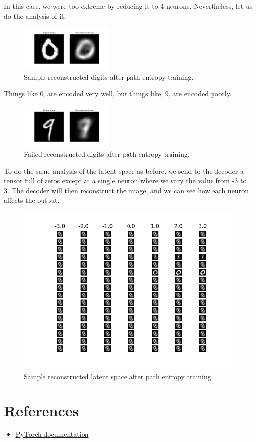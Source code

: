 \documentclass[12pt]{article}
\begin{document}
In this case, we were too extreme by reducing it to 4 neurons. Nevertheless, let us do the analysis of it.

\begin{figure}[h!]
    \centering
    \includegraphics[width=0.4\textwidth]{recon_example_path.png}
    \caption{Sample reconstructed digits after path entropy training.}
\end{figure}

Things like 0, are encoded very well, but things like, 9, are encoded poorly.

\begin{figure}[h!]
    \centering
    \includegraphics[width=0.4\textwidth]{recon_example_path_failed.png}
    \caption{Failed reconstructed digits after path entropy training.}
\end{figure}

To do the same analysis of the latent space as before, we send to the decoder a tensor full of zeros except at a single neuron where we vary the value from -3 to 3. The decoder will then reconstruct the image, and we can see how each neuron affects the output.

\begin{figure}[h!]
    \centering
    \includegraphics[width=1\textwidth]{latent_analyse_path.png}
    \caption{Sample reconstructed latent space after path entropy training.}
\end{figure}

\section{References}
\begin{itemize}
    \item \href{https://pytorch.org}{PyTorch documentation}
\end{itemize}
\end{document}
